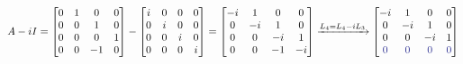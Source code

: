 \documentclass[11pt,a4paper]{article}
\begin{document}
{\begin{itemize}
    \[
    A - iI = \begin{bmatrix}
0 & 1 & 0& 0\\
0 &0 &1 & 0 \\
0 &0 &0& 1 \\
0 & 0 & -1&0
\end{bmatrix} - \begin{bmatrix}
i & 0 & 0& 0\\
0 &i &0 & 0 \\
0 &0 &i& 0 \\
0 & 0 & 0&i
\end{bmatrix} = \begin{bmatrix}
-i & 1 & 0& 0\\
0 &-i &1 & 0 \\
0 &0 &-i& 1 \\
0 & 0 & -1&-i
\end{bmatrix} \xrightarrow[]{L_4 = L_4 -iL_3} \begin{bmatrix}
-i & 1 & 0& 0\\
0 &-i &1 & 0 \\
0 &0 &-i& 1 \\
\textcolor{Blue}{0} & \textcolor{Blue}{0} & \textcolor{Blue}{0}& \textcolor{Blue}{0}
\end{bmatrix}
    \]
    

\end{itemize}}
\end{document}
